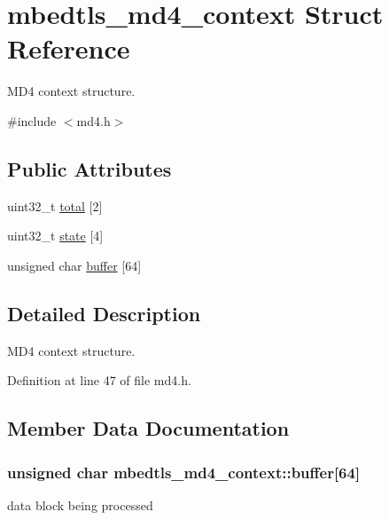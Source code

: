\hypertarget{structmbedtls__md4__context}{\section{mbedtls\-\_\-md4\-\_\-context Struct Reference}
\label{structmbedtls__md4__context}
}


M\-D4 context structure.  




{\ttfamily \#include $<$md4.\-h$>$}

\subsection*{Public Attributes}
\begin{DoxyCompactItemize}
\item 
uint32\-\_\-t \hyperlink{structmbedtls__md4__context_afabfb5a783d0033a857a375199bf38cc}{total} \mbox{[}2\mbox{]}
\item 
uint32\-\_\-t \hyperlink{structmbedtls__md4__context_afe9a40acdd5470eebce1b98f9379322e}{state} \mbox{[}4\mbox{]}
\item 
unsigned char \hyperlink{structmbedtls__md4__context_aa345ea12be5988ac3bba40ff49bc7277}{buffer} \mbox{[}64\mbox{]}
\end{DoxyCompactItemize}


\subsection{Detailed Description}
M\-D4 context structure. 

Definition at line 47 of file md4.\-h.



\subsection{Member Data Documentation}
\hypertarget{structmbedtls__md4__context_aa345ea12be5988ac3bba40ff49bc7277}{
\subsubsection[{buffer}]{\setlength{\rightskip}{0pt plus 5cm}unsigned char mbedtls\-\_\-md4\-\_\-context\-::buffer\mbox{[}64\mbox{]}}}\label{structmbedtls__md4__context_aa345ea12be5988ac3bba40ff49bc7277}
data block being processed 

